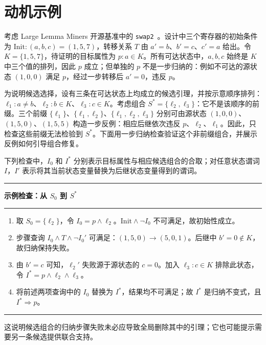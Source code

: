 \section{动机示例}

考虑 Large Lemma Miners 开源基准中的 \texttt{swap2}~\cite{peled2026artifact}。设计中三个寄存器的初始条件为 $\mathrm{Init}:(a,b,c)=(1,5,7)$，转移关系 $T$ 由 $a'=b$、$b'=c$、$c'=a$ 给出。令 $K=\{1,5,7\}$，待证明的目标属性为 $p: a\in K$。所有可达状态中，$a,b,c$ 始终是 $K$ 中三个值的排列，因此 $p$ 成立；但单独的 $p$ 不是一步归纳的：例如不可达的源状态 $(1,0,0)$ 满足 $p$，经过一步转移后 $a'=0$，违反 $p$。

为说明候选选择，设有三条在可达状态上均成立的候选引理，并按示意顺序排列：$\ell_1:a\ne b$、$\ell_2:b\in K$、$\ell_3:c\in K$。考虑组合 $S^*=\{\ell_2,\ell_3\}$：它不是该顺序的前缀。三个前缀 $\{\ell_1\}$、$\{\ell_1,\ell_2\}$、$\{\ell_1,\ell_2,\ell_3\}$ 分别可由源状态 $(1,0,0)$、$(1,5,0)$、$(1,5,5)$ 构造一步反例：相应后继依次违反 $p$、$\ell_2$、$\ell_1$。因此，只检查这些前缀无法检验到 $S^*$。下面用一步归纳检查验证这个非前缀组合，并展示反例如何引导组合修复。

下列检查中，$I_0$ 和 $I^*$ 分别表示目标属性与相应候选组合的合取；对任意状态谓词 $I$，$I'$ 表示将其当前状态变量替换为后继状态变量得到的谓词。

\noindent\begin{minipage}{\columnwidth}
\hrule\smallskip
\noindent\textbf{示例检查：从 $S_0$ 到 $S^*$}\par
\smallskip\hrule\smallskip
{\small
\begin{enumerate}
  \setlength{\topsep}{2pt}
  \setlength{\itemsep}{1pt}
  \setlength{\parsep}{0pt}
  \item 取 $S_0=\{\ell_2\}$，令 $I_0=p\land\ell_2$。$\mathrm{Init}\land\neg I_0$ 不可满足，故初始性成立。
  \item 步骤查询 $I_0\land T\land\neg I_0'$ 可满足：$(1,5,0)\to(5,0,1)$。后继中 $b'=0\notin K$，故归纳保持失败。
  \item 由 $b'=c$ 可知，$\ell_2'$ 失败源于源状态的 $c=0$。加入 $\ell_3:c\in K$ 排除此状态，令 $I^*=p\land\ell_2\land\ell_3$。
  \item 将前述两项查询中的 $I_0$ 替换为 $I^*$，结果均不可满足；故 $I^*$ 是归纳不变式，且 $I^*\Rightarrow p$。
\end{enumerate}
}
\hrule
\end{minipage}\par\smallskip

这说明候选组合的归纳步骤失败未必应导致全局删除其中的引理；它也可能提示需要另一条候选提供联合支持。
